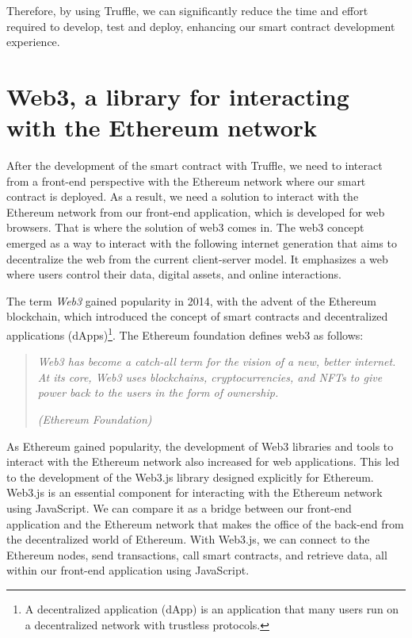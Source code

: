 Therefore, by using Truffle, we can significantly reduce the time and effort required to develop, test and deploy, enhancing our smart contract development experience.




\section{Web3, a library for interacting with the Ethereum network}
\label{sec:ch2_web3}

After the development of the smart contract with Truffle, we need to interact from a front-end perspective with the Ethereum network where our
smart contract is deployed. As a result, we need a solution to interact with the Ethereum network from our front-end application, which is
developed for web browsers. That is where the solution of web3 \cite{eth_web3} comes in. The web3 concept emerged as a way to interact with
the following internet generation that aims to decentralize the web from the current client-server model. It emphasizes a web where users control their data, digital assets, and online interactions.


The term \textit{Web3} gained popularity in 2014, with the advent of the Ethereum blockchain, which introduced the concept of smart contracts
and decentralized applications (dApps)\footnote{A decentralized application (dApp) is an application that many users run on a decentralized
   network with trustless protocols.}. The Ethereum foundation \cite{eth_web3} defines web3 as follows:


\begin{quote}
   \textit{Web3 has become a catch-all term for the vision of a new, better internet. At its core, Web3 uses blockchains, cryptocurrencies, and NFTs to give power back to the users in the form of ownership.}


   \textit{(Ethereum Foundation)}
\end{quote}


As Ethereum gained popularity, the development of Web3 libraries and tools to interact with the Ethereum network also increased for web applications.
This led to the development of the Web3.js library \cite{eth_web3js} designed explicitly for Ethereum. Web3.js is an essential component for interacting
with the Ethereum network using JavaScript. We can compare it as a bridge between our front-end application and the Ethereum network that makes the office of
the back-end from the decentralized world of Ethereum. With Web3.js, we can connect to the Ethereum nodes, send transactions, call smart contracts, and retrieve
data, all within our front-end application using JavaScript.


